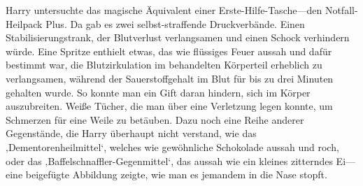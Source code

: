 Harry untersuchte das magische Äquivalent einer Erste-Hilfe-Tasche—den Notfall-Heilpack Plus. Da gab es zwei selbst-straffende Druckverbände. Einen Stabilisierungstrank, der Blutverlust verlangsamen und einen Schock verhindern würde. Eine Spritze enthielt etwas, das wie flüssiges Feuer aussah und dafür bestimmt war, die Blutzirkulation im behandelten Körperteil erheblich zu verlangsamen, während der Sauerstoffgehalt im Blut für bis zu drei Minuten gehalten wurde. So konnte man ein Gift daran hindern, sich im Körper auszubreiten. Weiße Tücher, die man über eine Verletzung legen konnte, um Schmerzen für eine Weile zu betäuben. Dazu noch eine Reihe anderer Gegenstände, die Harry überhaupt nicht verstand, wie das ‚Dementorenheilmittel‘, welches wie gewöhnliche Schokolade aussah und roch, oder das ‚Baffelschnaffler-Gegenmittel‘, das aussah wie ein kleines zitterndes Ei—eine beigefügte Abbildung zeigte, wie man es jemandem in die Nase stopft.

